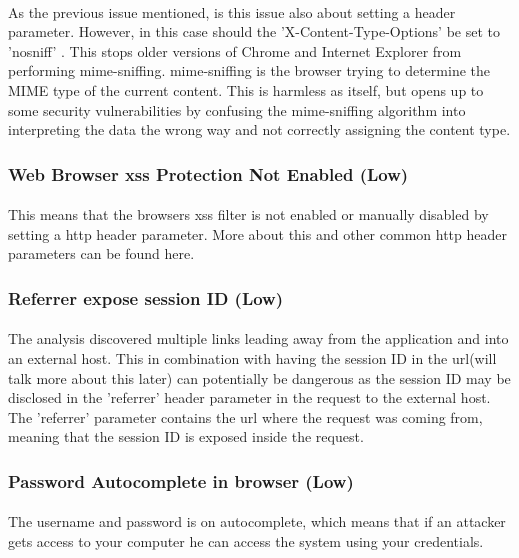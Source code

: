 \documentclass[11pt,english,a4paper]{report}
\begin{document}
\paragraph{}
As the previous issue mentioned, is this issue also about setting a header parameter.
However, in this case should the 'X-Content-Type-Options' be set to 'nosniff' \cite{no-sniff}. 
This stops older versions of Chrome and Internet Explorer from performing \gls{mime}-sniffing. 
\gls{mime}-sniffing is the browser trying to determine the MIME type of the current content. 
This is harmless as itself, but opens up to some security vulnerabilities by confusing the \gls{mime}-sniffing algorithm into interpreting the data the wrong way and not correctly assigning the content type.


\subsubsection{Web Browser \gls{xss} Protection Not Enabled (Low)}
\paragraph{}
This means that the browsers \gls{xss} filter is not enabled or manually disabled by setting a \gls{http} header parameter.
More about this and other common \gls{http} header parameters can be found here\cite{important-headers}. 

\subsubsection{Referrer expose session ID (Low)}
\paragraph{}
The analysis discovered multiple links leading away from the application and into an external host.
This in combination with having the session ID in the \gls{url}(will talk more about this later) can potentially be dangerous as the session ID may be disclosed in the 'referrer' header parameter in the request to the external host.
The 'referrer' parameter contains the \gls{url} where the request was coming from, meaning that the session ID is exposed inside the request.

\subsubsection{Password Autocomplete in browser (Low)}
\paragraph{}
The username and password is on autocomplete, which means that if an attacker gets access to your computer he can access the system using your credentials.
\end{document}
